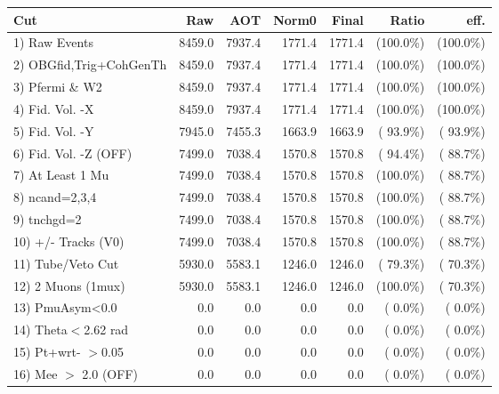  \begin{table}[h!]\centering
 \begin{tabular}{||l||r|r|r|r|r|r||}
 \hline
 \hline
 Cut & Raw & AOT & Norm0 & Final & Ratio & eff.       \\
 \hline
  1) Raw Events           &       8459.0 &       7937.4 &       1771.4 &       1771.4 & (100.0\%) & (100.0\%) \\
  2) OBGfid,Trig+CohGenTh &       8459.0 &       7937.4 &       1771.4 &       1771.4 & (100.0\%) & (100.0\%) \\
  3) Pfermi \& W2         &       8459.0 &       7937.4 &       1771.4 &       1771.4 & (100.0\%) & (100.0\%) \\
  4) Fid. Vol. -X         &       8459.0 &       7937.4 &       1771.4 &       1771.4 & (100.0\%) & (100.0\%) \\
  5) Fid. Vol. -Y         &       7945.0 &       7455.3 &       1663.9 &       1663.9 & ( 93.9\%) & ( 93.9\%) \\
  6) Fid. Vol. -Z (OFF)   &       7499.0 &       7038.4 &       1570.8 &       1570.8 & ( 94.4\%) & ( 88.7\%) \\
  7) At Least 1 Mu        &       7499.0 &       7038.4 &       1570.8 &       1570.8 & (100.0\%) & ( 88.7\%) \\
  8) ncand=2,3,4          &       7499.0 &       7038.4 &       1570.8 &       1570.8 & (100.0\%) & ( 88.7\%) \\
  9) tnchgd=2             &       7499.0 &       7038.4 &       1570.8 &       1570.8 & (100.0\%) & ( 88.7\%) \\
 10) +/- Tracks (V0)      &       7499.0 &       7038.4 &       1570.8 &       1570.8 & (100.0\%) & ( 88.7\%) \\
 11) Tube/Veto Cut        &       5930.0 &       5583.1 &       1246.0 &       1246.0 & ( 79.3\%) & ( 70.3\%) \\
 12) 2 Muons (1mux)       &       5930.0 &       5583.1 &       1246.0 &       1246.0 & (100.0\%) & ( 70.3\%) \\
 13) PmuAsym<0.0          &          0.0 &          0.0 &          0.0 &          0.0 & (  0.0\%) & (  0.0\%) \\
 14) Theta$<$2.62 rad     &          0.0 &          0.0 &          0.0 &          0.0 & (  0.0\%) & (  0.0\%) \\
 15) Pt+wrt- $>$0.05      &          0.0 &          0.0 &          0.0 &          0.0 & (  0.0\%) & (  0.0\%) \\
 16) Mee $>$ 2.0  (OFF)   &          0.0 &          0.0 &          0.0 &          0.0 & (  0.0\%) & (  0.0\%) \\

\end{tabular}
\end{table}
